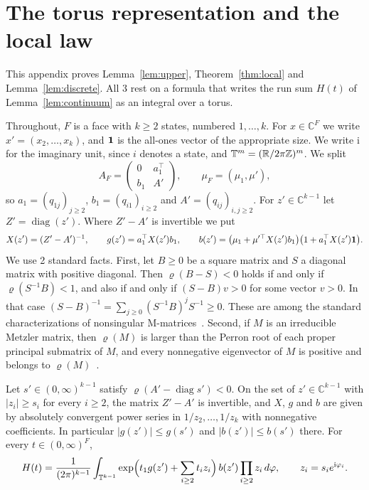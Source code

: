 \section{The torus representation and the local law}\label{app:torus}

This appendix proves Lemma~\ref{lem:upper}, Theorem~\ref{thm:local} and
Lemma~\ref{lem:discrete}. All 3 rest on a formula that writes the run sum
$H(t)$ of Lemma~\ref{lem:continuum} as an integral over a torus.

Throughout, $F$ is a face with $k\ge2$ states, numbered $1,\dots,k$. For
$x\in\mathbb C^F$ we write $x'=(x_2,\dots,x_k)$, and $\mathbf{1}$ is the all-ones
vector of the appropriate size. We write $\mathrm i$ for the imaginary unit,
since $i$ denotes a state, and $\mathbb T^m=(\mathbb{R}/2\pi\mathbb{Z})^m$. We split
\[
A_F=\begin{pmatrix}0&a_1^\top\\ b_1&A'\end{pmatrix},\qquad
\mu_F=(\mu_1,\mu'),
\]
so $a_1=(q_{1j})_{j\ge2}$, $b_1=(q_{i1})_{i\ge2}$ and
$A'=(q_{ij})_{i,j\ge2}$. For $z'\in\mathbb C^{k-1}$ let
$Z'=\operatorname{diag}(z')$. Where $Z'-A'$ is invertible we put
\[
X(z')=(Z'-A')^{-1},\qquad g(z')=a_1^\top X(z')b_1,\qquad
b(z')=\bigl(\mu_1+\mu'^\top X(z')b_1\bigr)\bigl(1+a_1^\top X(z')\mathbf{1}\bigr).
\]
We use 2 standard facts. First, let $B\ge0$ be a square matrix and $S$ a
diagonal matrix with positive diagonal. Then $\varrho(B-S)<0$ holds if and
only if $\varrho(S^{-1}B)<1$, and also if and only if $(S-B)v>0$ for some
vector $v>0$. In that case
$(S-B)^{-1}=\sum_{j\ge0}(S^{-1}B)^jS^{-1}\ge0$. These are among the standard
characterizations of nonsingular M-matrices~\cite[Ch.~6]{bermanplemmons1994}.
Second, if $M$ is an irreducible Metzler matrix, then $\varrho(M)$ is larger
than the Perron root of each proper principal submatrix of $M$, and every
nonnegative eigenvector of $M$ is positive and belongs to
$\varrho(M)$~\cite{bermanplemmons1994}.

\begin{lemma}\label{lem:torus}
Let $s'\in(0,\infty)^{k-1}$ satisfy
$\varrho(A'-\operatorname{diag}s')<0$. On the set of $z'\in\mathbb C^{k-1}$
with $\lvert z_i\rvert\ge s_i$ for every $i\ge2$, the matrix $Z'-A'$ is
invertible, and $X$, $g$ and $b$ are given by absolutely convergent power
series in $1/z_2,\dots,1/z_k$ with nonnegative coefficients. In particular
$\lvert g(z')\rvert\le g(s')$ and $\lvert b(z')\rvert\le b(s')$ there. For
every $t\in(0,\infty)^F$,
\[
H(t)=\frac1{(2\pi)^{k-1}}\int_{\mathbb T^{k-1}}
\exp\Bigl(t_1g(z')+\sum_{i\ge2}t_iz_i\Bigr)\,b(z')\prod_{i\ge2}z_i\,d\varphi,
\qquad z_i=s_ie^{\mathrm i\varphi_i}.
\]
\end{lemma}

